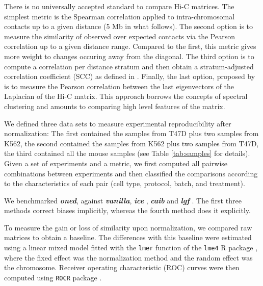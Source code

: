 \documentclass{bioinfo}
\begin{document}
\begin{methods}
There is no universally accepted standard to compare Hi-C matrices. The
simplest metric is the Spearman correlation applied to intra-chromosomal
contacts up to a given distance (5 Mb in what follows). The second option
is to measure the similarity of observed over expected contacts via the
Pearson correlation up to a given distance range. Compared to the first,
this metric gives more weight to changes occuring away from the diagonal.
The third option is to compute a correlation per distance stratum and then
obtain a stratum-adjusted correlation coefficient (SCC) as defined in
\cite{yang2017hicrep}. Finally, the last option, proposed by
\cite{yan2017hicspector} is to measure the Pearson correlation between the
last eigenvectors of the Laplacian of the Hi-C matrix. This approach
borrows the concepts of spectral clustering \citep{von2007tutorial} and
amounts to comparing high level features of the matrix.

We defined three data sets to measure experimental reproducibility after
normalization: The first contained the samples from T47D plus two samples
from K562, the second contained the samples from K562 plus two samples
from T47D, the third contained all the mouse samples (see Table
\ref{tab:samples} for details). Given a set of experiments and a metric,
we first computed all pairwise combinations between experiments and then
classified the comparisons according to the characteristics of each pair
(cell type, protocol, batch, and treatment).

We benchmarked \textbf{\textit{oned}}, against \textbf{\textit{vanilla}},
\textbf{\textit{ice}} \citep{imakaev2012iterative}, \textbf{\textit{caib}}
\citep{wu2016computational} and \textbf{\textit{lgf}}
\citep{hu2012hicnorm, servant2012hitc}. The first three methods correct
biases implicitly, whereas the fourth method does it explicitly.

To measure the gain or loss of similarity upon normalization, we compared
raw matrices to obtain a baseline. The differences with this baseline were
estimated using a linear mixed model fitted with the \texttt{lmer}
function of the \texttt{lme4} R package \citep{bates2015lme4}, where the
fixed effect was the normalization method and the random effect was the
chromosome. Receiver operating characteristic (ROC) curves were then
computed using \texttt{ROCR} package \citep{sing2005rocr}.

\end{methods}




\end{document}
